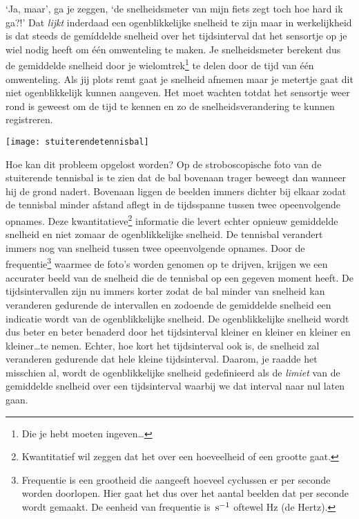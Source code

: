 \documentclass{ximera}
\begin{document}
`Ja, maar', ga je zeggen, `de snelheidsmeter van mijn fiets zegt toch hoe hard ik ga?!' Dat \emph{lijkt} inderdaad een ogenblikkelijke snelheid te zijn maar in werkelijkheid is dat steeds de gem\'iddelde snelheid over het \mbox{tijds}\-in\-ter\-val dat het sensortje op je wiel nodig heeft om \'e\'en omwenteling te maken. Je snelheidsmeter berekent dus de gemiddelde snelheid door je wielomtrek\footnote{Die je hebt moeten ingeven\ldots} te delen door de tijd van \'e\'en omwenteling. Als jij plots remt gaat je snelheid afnemen maar je metertje gaat dit niet ogenblikkelijk kunnen aangeven. Het moet wachten totdat het sensortje weer rond is geweest om de tijd te kennen en zo de snelheidsverandering te kunnen registreren.
\begin{image}

\texttt{[image: stuiterendetennisbal]}
\end{image}

Hoe kan dit probleem opgelost worden? Op de stroboscopische foto van de stuiterende tennisbal is te zien dat de bal bovenaan trager beweegt dan wanneer hij de grond nadert. Bovenaan liggen de beelden immers dichter bij elkaar zodat de tennisbal minder afstand aflegt in de tijdsspanne tussen twee opeenvolgende opnames. 
Deze kwantitatieve\footnote{Kwantitatief wil zeggen dat het over een hoeveelheid of een grootte gaat.} informatie die levert echter opnieuw gemiddelde snelheid en niet zomaar de ogenblikkelijke snelheid. De tennisbal verandert immers nog van snelheid tussen twee opeenvolgende opnames. Door de frequentie\footnote{Frequentie is een grootheid die aangeeft hoeveel cyclussen er per seconde worden doorlopen. Hier gaat het dus over het aantal beelden dat per seconde wordt gemaakt. De eenheid van frequentie is $\rm\,s^{-1}$ oftewel Hz (de Hertz).} waarmee de foto's worden genomen op te drijven, krijgen we een accurater beeld van de snelheid die de tennisbal op een gegeven moment heeft. De tijdsintervallen zijn nu immers korter zodat de bal minder van snelheid kan veranderen gedurende de intervallen en zodoende de gemiddelde snelheid een indicatie wordt van de ogenblikkelijke snelheid. De ogenblikkelijke snelheid wordt dus beter en beter benaderd door het tijdsinterval kleiner en kleiner en kleiner en kleiner\ldots te nemen. Echter, hoe kort het tijdsinterval ook is, de snelheid zal veranderen gedurende dat hele kleine tijdsinterval. Daarom, je raadde het misschien al, wordt de ogenblikkelijke snelheid gedefinieerd als de \emph{limiet} van de gemiddelde snelheid over een tijdsinterval waarbij we dat interval naar nul laten gaan. 
\end{document}
